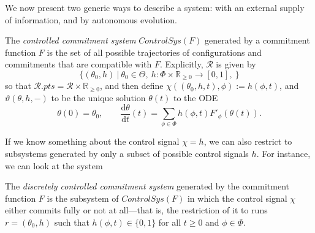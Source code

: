 \documentclass{article}
\newcommand\pts[1]{#1.\mathit{pts}}
\newcommand\R{\mathcal R}
\begin{document}
We now present two generic ways to describe a system: with an external supply of information, and by autonomous evolution.

\begin{defn}
    The \emph{controlled commitment system}
    $\mathit{ControlSys}(F)$
    generated by a commitment function $F$ is the set  of all possible trajectories of configurations and commitments that are compatible with $F$.
    Explicitly, $\R$ is given by
    \[
        \Big\{ (\theta_0, h) ~\Big|~  \theta_0 \in \Theta,~
            h : \Phi \times \mathbb R_{\ge 0} \to [0,1],~
             \Big\}
    \]
    so that $\pts \R = \R \times \mathbb R_{\ge 0}$,
    and then define
    $\chi((\theta_0,h,t),\phi) := h(\phi, t)$,
    and
    $\vartheta(\theta,h,-)$ to be the unique solution $\theta(t)$ to the ODE
    \[
        \theta(0) = \theta_0,
        \qquad \frac{\mathrm d\theta}{\mathrm d t} (t) =
            \sum_{\phi \in \Phi} h(\phi, t) F'_\phi(\theta(t)).
    \]
\end{defn}

If we know something about the control signal $\chi = h$, we can also restrict to subsystems generated by only a subset of possible
control signals $h$. For instance, we can look at the system

\begin{defn}
    The \emph{discretely controlled commitment system} generated by the commitment function $F$ is the subsystem of $\mathit{ControlSys}(F)$ in which the control signal $\chi$ either commits fully or not at all---that is,
    the restriction of it to runs $r = (\theta_0, h)$ such that $h(\phi, t) \in \{0,1\}$
            for all $t \ge 0$ and $\phi \in \Phi$.
\end{defn}


%
\end{document}
